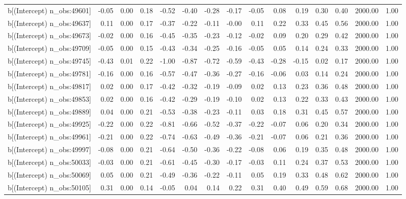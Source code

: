 \begin{table}[ht]
\begin{tabular}{rrrrrrrrrrrrrrr}
  b[(Intercept) n\_obs:49601] & -0.05 & 0.00 & 0.18 & -0.52 & -0.40 & -0.28 & -0.17 & -0.05 & 0.08 & 0.19 & 0.30 & 0.40 & 2000.00 & 1.00 \\ 
  b[(Intercept) n\_obs:49637] & 0.11 & 0.00 & 0.17 & -0.37 & -0.22 & -0.11 & -0.00 & 0.11 & 0.22 & 0.33 & 0.45 & 0.56 & 2000.00 & 1.00 \\ 
  b[(Intercept) n\_obs:49673] & -0.02 & 0.00 & 0.16 & -0.45 & -0.35 & -0.23 & -0.12 & -0.02 & 0.09 & 0.20 & 0.29 & 0.42 & 2000.00 & 1.00 \\ 
  b[(Intercept) n\_obs:49709] & -0.05 & 0.00 & 0.15 & -0.43 & -0.34 & -0.25 & -0.16 & -0.05 & 0.05 & 0.14 & 0.24 & 0.33 & 2000.00 & 1.00 \\ 
  b[(Intercept) n\_obs:49745] & -0.43 & 0.01 & 0.22 & -1.00 & -0.87 & -0.72 & -0.59 & -0.43 & -0.28 & -0.15 & 0.02 & 0.17 & 2000.00 & 1.00 \\ 
  b[(Intercept) n\_obs:49781] & -0.16 & 0.00 & 0.16 & -0.57 & -0.47 & -0.36 & -0.27 & -0.16 & -0.06 & 0.03 & 0.14 & 0.24 & 2000.00 & 1.00 \\ 
  b[(Intercept) n\_obs:49817] & 0.02 & 0.00 & 0.17 & -0.42 & -0.32 & -0.19 & -0.09 & 0.02 & 0.13 & 0.23 & 0.36 & 0.48 & 2000.00 & 1.00 \\ 
  b[(Intercept) n\_obs:49853] & 0.02 & 0.00 & 0.16 & -0.42 & -0.29 & -0.19 & -0.10 & 0.02 & 0.13 & 0.22 & 0.33 & 0.43 & 2000.00 & 1.00 \\ 
  b[(Intercept) n\_obs:49889] & 0.04 & 0.00 & 0.21 & -0.53 & -0.38 & -0.23 & -0.11 & 0.03 & 0.18 & 0.31 & 0.45 & 0.57 & 2000.00 & 1.00 \\ 
  b[(Intercept) n\_obs:49925] & -0.22 & 0.00 & 0.22 & -0.81 & -0.66 & -0.52 & -0.37 & -0.22 & -0.07 & 0.06 & 0.20 & 0.34 & 2000.00 & 1.00 \\ 
  b[(Intercept) n\_obs:49961] & -0.21 & 0.00 & 0.22 & -0.74 & -0.63 & -0.49 & -0.36 & -0.21 & -0.07 & 0.06 & 0.21 & 0.36 & 2000.00 & 1.00 \\ 
  b[(Intercept) n\_obs:49997] & -0.08 & 0.00 & 0.21 & -0.64 & -0.50 & -0.36 & -0.22 & -0.08 & 0.06 & 0.19 & 0.35 & 0.48 & 2000.00 & 1.00 \\ 
  b[(Intercept) n\_obs:50033] & -0.03 & 0.00 & 0.21 & -0.61 & -0.45 & -0.30 & -0.17 & -0.03 & 0.11 & 0.24 & 0.37 & 0.53 & 2000.00 & 1.00 \\ 
  b[(Intercept) n\_obs:50069] & 0.05 & 0.00 & 0.21 & -0.49 & -0.36 & -0.22 & -0.11 & 0.05 & 0.19 & 0.33 & 0.48 & 0.62 & 2000.00 & 1.00 \\ 
  b[(Intercept) n\_obs:50105] & 0.31 & 0.00 & 0.14 & -0.05 & 0.04 & 0.14 & 0.22 & 0.31 & 0.40 & 0.49 & 0.59 & 0.68 & 2000.00 & 1.00 \\ 

\end{tabular}
\end{table}
